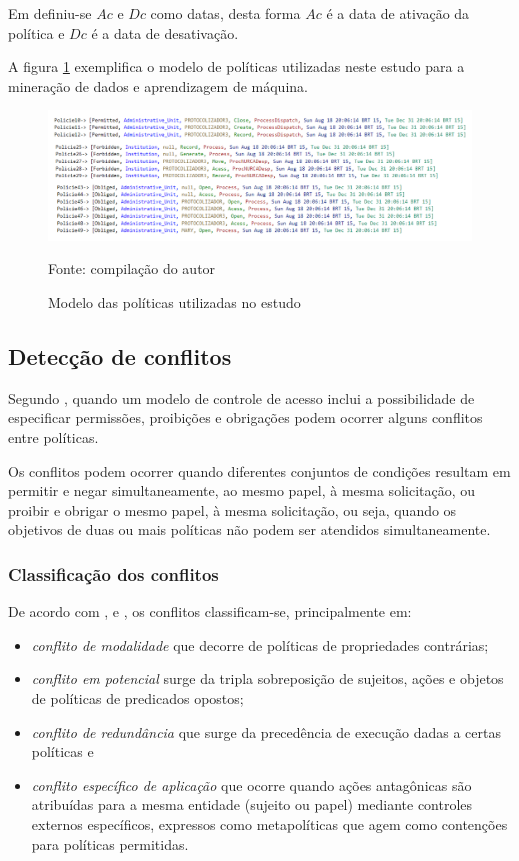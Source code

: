Em \cite{sarkis2017} definiu-se $ Ac $ e $ Dc $ como datas, desta forma $ Ac $ é a data de ativação da política e $ Dc $ é a data de desativação.

A figura \ref{fig:modelo_politica} exemplifica o modelo de políticas utilizadas neste estudo para a mineração de dados e aprendizagem de máquina.

\begin{figure}[h!]
	\centering
	\includegraphics[width=.8\textwidth]{imagens/modelo_politica.png}
	\caption{Modelo das políticas utilizadas no estudo}
	{\scriptsize Fonte: compilação do autor}
	\label{fig:modelo_politica}
\end{figure}

\subsection{Detecção de conflitos} \label{deteccao_conflitos}

Segundo \cite{kalam_organization_2003}, quando um modelo de controle de acesso inclui a possibilidade de especificar permissões, proibições e obrigações podem ocorrer alguns conflitos entre políticas. 

Os conflitos podem ocorrer quando diferentes conjuntos de condições resultam em permitir e negar simultaneamente, ao mesmo papel, à mesma solicitação, ou proibir e obrigar o mesmo papel, à mesma solicitação, ou seja, quando os objetivos de duas ou mais políticas não podem ser atendidos simultaneamente. \cite{cuppens_high_2007}

\subsubsection{Classificação dos conflitos}

De acordo com \cite{cuppens_high_2007}, \cite{sloman_security_2002} e \cite{lupu_conflicts_1999}, os conflitos classificam-se, principalmente em: \begin{itemize}
	\item \textit{conflito de modalidade} que decorre de políticas de propriedades contrárias; 
	\item \textit{conflito em potencial} surge da tripla sobreposição de sujeitos, ações e objetos de políticas de predicados opostos;
	\item \textit{conflito de redundância} que surge da precedência de execução dadas a certas políticas e
	\item \textit{conflito específico de aplicação} que ocorre quando ações antagônicas são atribuídas para a mesma entidade (sujeito ou papel) mediante controles externos específicos, expressos como metapolíticas que agem como contenções para políticas permitidas.
\end{itemize}

